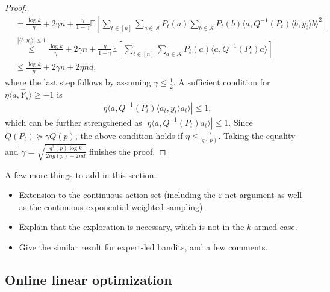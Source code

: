\documentclass[10pt,a4article]{amsart}
\numberwithin{equation}{section}
\theoremstyle{plain}
\theoremstyle{definition}
\def\E{{\mathbb E}}
\def\e{{\varepsilon}}
\begin{document}
\begin{proof}
\begin{align*}
&= \frac{\log k}{\eta}+2\gamma n+\frac{\eta}{1-\gamma}\E\left[\sum_{t\in [n]}\sum_{a\in\mathcal A} P_t(a)\sum_{b\in\mathcal A}P_t(b)\langle a, Q^{-1}(P_t)\langle b, y_t\rangle b\rangle^2\right]\\
&\stackrel{|\langle b, y_t\rangle|\leq 1}{\leq}\frac{\log k}{\eta}+2\gamma n+\frac{\eta}{1-\gamma}\E\left[\sum_{t\in [n]}\sum_{a\in\mathcal A} P_t(a)\langle a, Q^{-1}(P_t)a\rangle\right]\\
&\leq \frac{\log k}{\eta}+2\gamma n+2\eta nd,
\end{align*}
where the last step follows by assuming $\gamma\leq\frac{1}{2}$. A sufficient condition for $\eta\langle a, \hat{Y}_s\rangle\geq -1$ is
\begin{align*}
\left|\eta\langle a, Q^{-1}(P_t)\langle a_t, y_t\rangle a_t\rangle\right|\leq 1,
\end{align*}
which can be further strengthened as $\left|\eta\langle a, Q^{-1}(P_t)a_t\rangle\right|\leq 1$. Since $Q(P_t)\succcurlyeq \gamma Q(p)$, the above condition holds if $\eta\leq \frac{\gamma}{g(p)}$. Taking the equality and $\gamma=\sqrt{\frac{g^2(p)\log k}{2ng(p)+2nd}}$ finishes the proof.   

\end{proof}


A few more things to add in this section:
\begin{itemize}
\item Extension to the continuous action set (including the $\e$-net argument as well as the continuous exponential weighted sampling). 

\item Explain that the exploration is necessary, which is not in the $k$-armed case. 

\item Give the similar result for expert-led bandits, and a few comments. 

\end{itemize}


\subsection{Online linear optimization}
\end{document}
